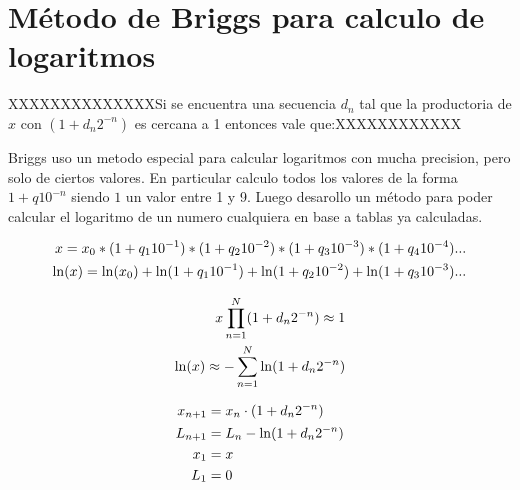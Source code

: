 \documentclass[10pt,a4paper]{book}
\begin{document}
\chapter{M\'etodo de Briggs para calculo de logaritmos}

XXXXXXXXXXXXXXSi se encuentra una secuencia $d_n$ tal que la productoria de $x$ con $(1+d_n 2^{-n})$ es cercana a 1 entonces vale que:XXXXXXXXXXXX

Briggs uso un metodo especial para calcular logaritmos con mucha precision, pero solo de ciertos valores. En particular calculo todos los valores de la forma
$1+q 10^{-n}$ siendo $1$ un valor entre 1 y 9. Luego desarollo un m\'etodo para poder calcular el logaritmo de un numero cualquiera en base a tablas ya calculadas.


\begin{equation} \label{eq:briggs_ln}
   \begin{subequations}
      \begin{aligned}
         x = x_0 * (1+q_1 10^{-1}) * (1+q_2 10^{-2}) * (1+q_3 10^{-3}) * (1+q_4 10^{-4}) ... \\
         \ln(x) = \ln(x_0) + \ln(1+q_1 10^{-1}) + \ln(1+q_2 10^{-2}) + \ln(1+q_3 10^{-3}) ...
      \end{aligned}
   \end{subequations}
\end{equation}

\begin{equation} \label{eq:briggs_ln}
   \begin{subequations}
      \begin{aligned}
         x \prod_{n=1}^{N} (1+d_n 2^{-n}) \approx 1     \\
         \ln(x) \approx - \sum_{n=1}^{N} \ln(1+d_n 2^{-n})
      \end{aligned}
   \end{subequations}
\end{equation}

\begin{equation} \label{eq:briggs_ln}
   \begin{subequations}
      \begin{aligned}
         x_{n+1}  &= x_n \cdot (1 + d_n 2^{-n})  \\
         L_{n+1}  &= L_n -  \ln(1 + d_n 2^{-n})  \\
         x_1      &= x  \\
         L_1      &= 0
      \end{aligned}
   \end{subequations}
\end{equation}
\end{document}
